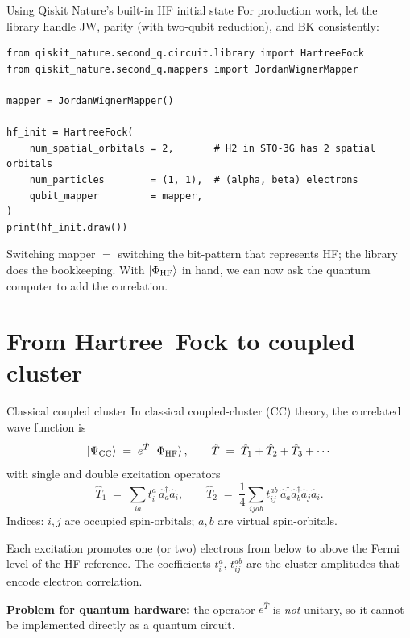\documentclass[10pt,aspectratio=169]{beamer}
\begin{document}
\begin{frame}[fragile]{Using Qiskit Nature's built-in HF initial state}
For production work, let the library handle JW, parity (with two-qubit reduction), and BK consistently:
\begin{lstlisting}
from qiskit_nature.second_q.circuit.library import HartreeFock
from qiskit_nature.second_q.mappers import JordanWignerMapper

mapper = JordanWignerMapper()

hf_init = HartreeFock(
    num_spatial_orbitals = 2,       # H2 in STO-3G has 2 spatial orbitals
    num_particles        = (1, 1),  # (alpha, beta) electrons
    qubit_mapper         = mapper,
)
print(hf_init.draw())
\end{lstlisting}

\smallskip
Switching mapper $=$ switching the bit-pattern that represents HF; the library does the bookkeeping.
With $\ket{\Phi_{\mathrm{HF}}}$ in hand, we can now ask the quantum computer to add the correlation.
\end{frame}

\section{From Hartree--Fock to coupled cluster}

\begin{frame}{Classical coupled cluster}
In classical coupled-cluster (CC) theory, the correlated wave function is
\[
\ket{\Psi_{\mathrm{CC}}} \;=\; e^{\hat T}\,\ket{\Phi_{\mathrm{HF}}},
\qquad
\hat T \;=\; \hat T_1 + \hat T_2 + \hat T_3 + \cdots
\]
with single and double excitation operators
\[
\hat T_1 \;=\; \sum_{ia} t_i^{a}\,\hat a_a^\dagger \hat a_i,
\qquad
\hat T_2 \;=\; \frac14\sum_{ijab} t_{ij}^{ab}\,\hat a_a^\dagger \hat a_b^\dagger \hat a_j \hat a_i.
\]
Indices: $i,j$ are occupied spin-orbitals; $a,b$ are virtual spin-orbitals.

\bigskip
Each excitation promotes one (or two) electrons from below to above the Fermi level of the HF reference.
The coefficients $t_i^a,\,t_{ij}^{ab}$ are the cluster amplitudes that encode electron correlation.

\bigskip
\textbf{Problem for quantum hardware:} the operator $e^{\hat T}$ is \emph{not} unitary, so it cannot be implemented directly as a quantum circuit.
\end{frame}
\end{document}
